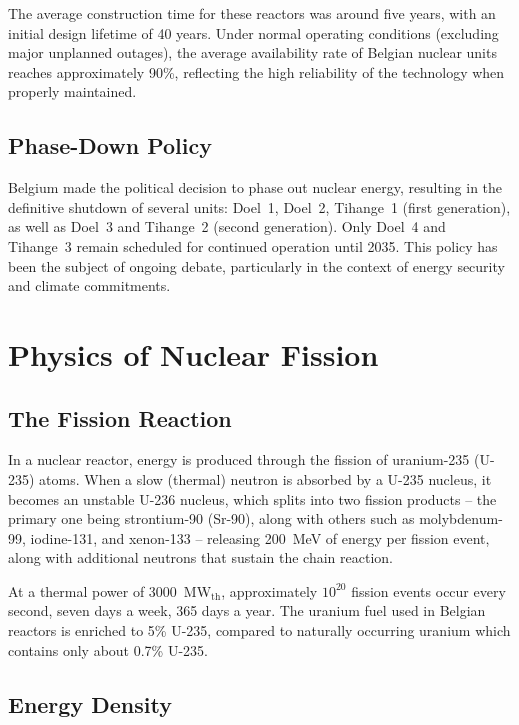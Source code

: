 The average construction time for these reactors was around five years, with an initial design lifetime of 40 years. Under normal operating conditions (excluding major unplanned outages), the average availability rate of Belgian nuclear units reaches approximately 90\%, reflecting the high reliability of the technology when properly maintained.

\subsection{Phase-Down Policy}

Belgium made the political decision to phase out nuclear energy, resulting in the definitive shutdown of several units: Doel~1, Doel~2, Tihange~1 (first generation), as well as Doel~3 and Tihange~2 (second generation). Only Doel~4 and Tihange~3 remain scheduled for continued operation until 2035. This policy has been the subject of ongoing debate, particularly in the context of energy security and climate commitments.

\section{Physics of Nuclear Fission}

\subsection{The Fission Reaction}

In a nuclear reactor, energy is produced through the fission of uranium-235 (U-235) atoms. When a slow (thermal) neutron is absorbed by a U-235 nucleus, it becomes an unstable U-236 nucleus, which splits into two fission products -- the primary one being strontium-90 (Sr-90), along with others such as molybdenum-99, iodine-131, and xenon-133 -- releasing 200~MeV of energy per fission event, along with additional neutrons that sustain the chain reaction.

At a thermal power of 3000~MW$_{\text{th}}$, approximately $10^{20}$ fission events occur every second, seven days a week, 365 days a year. The uranium fuel used in Belgian reactors is enriched to 5\% U-235, compared to naturally occurring uranium which contains only about 0.7\% U-235.

\subsection{Energy Density}

